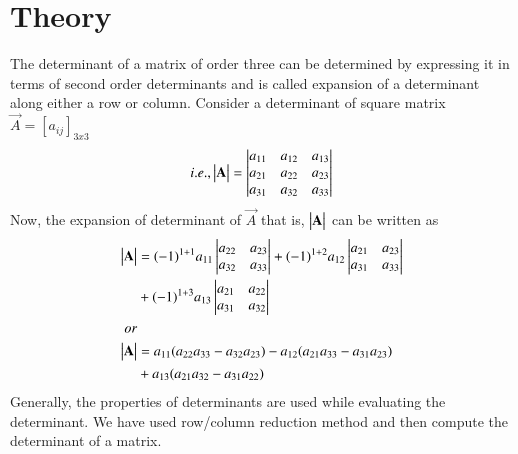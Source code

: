 \documentclass[journal,12pt,twocolumn]{IEEEtran}
\begin{document}
\section{Theory}
	The determinant of a matrix of order three can be determined by expressing it in terms of second order determinants and is called expansion of a determinant along either a row or column.
	Consider a determinant of square matrix $\vec{A} = [a_{ij}]_{3x3}$
	\begin{align}
		i.e.,  \begin{vmatrix}\mathbf{A}\end{vmatrix} = \begin{vmatrix}a_{11} & a_{12} & a_{13}\\ a_{21} & a_{22} & a_{23}\\ a_{31} & a_{32} & a_{33}\end{vmatrix}
	\end{align}
Now, the expansion of determinant of $\vec{A}$ that is, $\begin{vmatrix}\mathbf{A}\end{vmatrix}$ can be written as 
\begin{align}
	\begin{vmatrix}\mathbf{A}\end{vmatrix} &= (-1)^{1+1} a_{11} \begin{vmatrix}a_{22} & a_{23}\\a_{32} & a_{33}\end{vmatrix} + (-1)^{1+2} a_{12} \begin{vmatrix}a_{21} & a_{23}\\a_{31} & a_{33}\end{vmatrix} \nonumber \\ 
	&+ (-1)^{1+3} a_{13} \begin{vmatrix}a_{21} & a_{22}\\a_{31} & a_{32}\end{vmatrix}\\
	or \nonumber\\
	\begin{vmatrix}\mathbf{A}\end{vmatrix} &= a_{11}(a_{22}a_{33} - a_{32}a_{23}) - a_{12}(a_{21}a_{33} - a_{31}a_{23}) \nonumber \\
	&+ a_{13}(a_{21}a_{32} - a_{31}a_{22})
\end{align}
Generally, the properties of determinants are used while evaluating the determinant. We have used row/column reduction method and then compute the determinant of a matrix.
\end{document}
